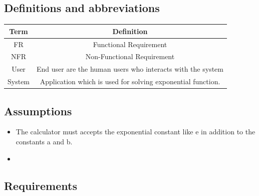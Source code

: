 \documentclass[a4paper,12pt]{report}
\begin{document}
\subsection{Definitions and abbreviations}
\begin{center}
    \begin{tabular}{|c|c|}
         \hline
         Term & Definition \\
         \hline\hline
         FR & Functional Requirement \\
         \hline
         NFR & Non-Functional Requirement \\
         \hline
         User & End user are the human users who interacts with the system \\
         \hline
         System & Application which is used for solving exponential function. \\
         \hline
        \end{tabular}
        \label{tab:xyz}
\end{center}

\subsection{Assumptions}
\begin{itemize}
    \item The calculator must accepts the exponential constant like e in addition to the constants a and b.
    \item

\end{itemize}

\subsection{Requirements}
\end{document}
